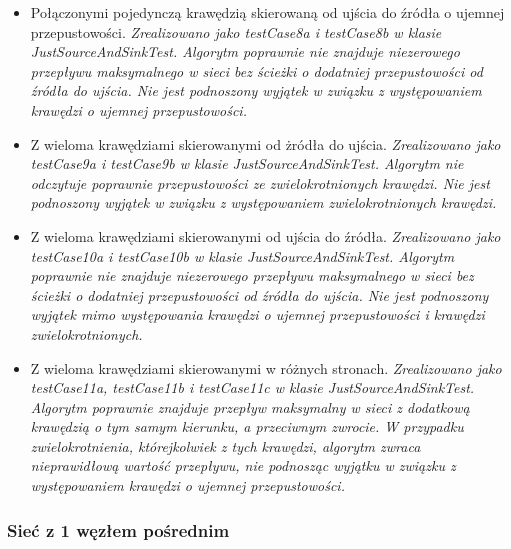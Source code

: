 \begin{itemize}[nosep]
    \item Połączonymi pojedynczą krawędzią skierowaną od ujścia do źródła o ujemnej przepustowości.
    \emph{Zrealizowano jako testCase8a i testCase8b w klasie JustSourceAndSinkTest.
    Algorytm poprawnie nie znajduje niezerowego przepływu maksymalnego w sieci
    bez ścieżki o dodatniej przepustowości od źródła do ujścia. Nie jest podnoszony
    wyjątek w związku z występowaniem krawędzi o ujemnej przepustowości.}

    \item Z wieloma krawędziami skierowanymi od żródła do ujścia.
    \emph{Zrealizowano jako testCase9a i testCase9b w klasie JustSourceAndSinkTest.
    Algorytm nie odczytuje poprawnie przepustowości ze zwielokrotnionych krawędzi.
    Nie jest podnoszony wyjątek w związku z występowaniem zwielokrotnionych krawędzi.}

    \item Z wieloma krawędziami skierowanymi od ujścia do źródła.
    \emph{Zrealizowano jako testCase10a i testCase10b w klasie JustSourceAndSinkTest.
    Algorytm poprawnie nie znajduje niezerowego przepływu maksymalnego w sieci
    bez ścieżki o dodatniej przepustowości od źródła do ujścia. Nie jest podnoszony
    wyjątek mimo występowania krawędzi o ujemnej przepustowości i krawędzi
    zwielokrotnionych.}

    \item Z wieloma krawędziami skierowanymi w różnych stronach.
    \emph{Zrealizowano jako testCase11a, testCase11b i testCase11c w klasie JustSourceAndSinkTest.
    Algorytm poprawnie znajduje przepływ maksymalny w sieci z dodatkową krawędzią
    o tym samym kierunku, a przeciwnym zwrocie. W przypadku zwielokrotnienia,
    którejkolwiek z tych krawędzi, algorytm zwraca nieprawidłową wartość
    przepływu, nie podnosząc wyjątku w związku z występowaniem krawędzi
    o ujemnej przepustowości.}

\end{itemize}


\subsubsection{Sieć z 1 węzłem pośrednim}

